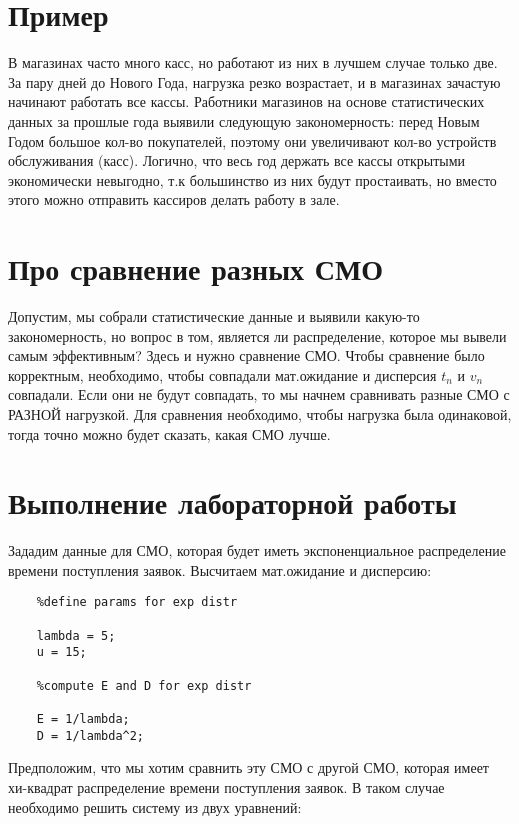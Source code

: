 \section*{\textbf{Пример}}

В магазинах часто много касс, но работают из них в лучшем случае только две. За пару дней до Нового Года,
нагрузка резко возрастает, и в магазинах зачастую начинают работать все кассы. Работники магазинов на основе статистических данных
за прошлые года выявили следующую закономерность: перед Новым Годом большое кол-во покупателей, поэтому они увеличивают кол-во 
устройств обслуживания (касс). Логично, что весь год держать все кассы открытыми экономически невыгодно, т.к большинство
из них будут простаивать, но вместо этого можно отправить кассиров делать работу в зале.

\section*{\textbf{Про сравнение разных СМО}}

Допустим, мы собрали статистические данные и выявили какую-то закономерность, но вопрос в том, является ли распределение, которое
мы вывели самым эффективным? Здесь и нужно сравнение СМО. Чтобы сравнение было корректным, необходимо, чтобы совпадали мат.ожидание
и дисперсия $t_n$ и $v_n$ совпадали. Если они не будут совпадать, то мы начнем сравнивать разные СМО с РАЗНОЙ нагрузкой. Для сравнения
необходимо, чтобы нагрузка была одинаковой, тогда точно можно будет сказать, какая СМО лучше.

\section*{\textbf{Выполнение лабораторной работы}}

Зададим данные для СМО, которая будет иметь экспоненциальное распределение времени поступления заявок. Высчитаем мат.ожидание и дисперсию:

\begin{lstlisting}
    %define params for exp distr

    lambda = 5;
    u = 15;

    %compute E and D for exp distr

    E = 1/lambda;
    D = 1/lambda^2;
\end{lstlisting}

Предположим, что мы хотим сравнить эту СМО с другой СМО, которая имеет хи-квадрат распределение времени поступления заявок. В таком
случае необходимо решить систему из двух уравнений:

